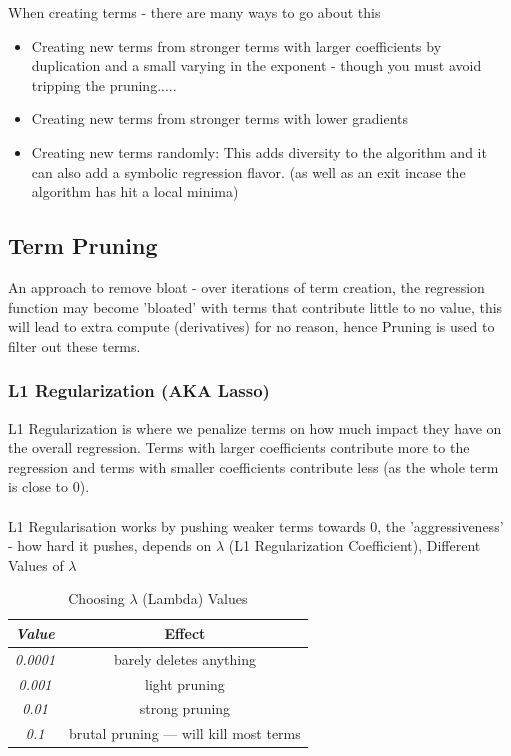 \documentclass[11pt]{article}
\begin{document}
When creating terms - there are many ways to go about this
\begin{itemize}
    \item Creating new terms from stronger terms with larger coefficients by duplication and a small varying in the exponent - though you must avoid tripping the pruning.....
    \item Creating new terms from stronger terms with lower gradients
    \item Creating new terms randomly: This adds diversity to the algorithm and it can also add a symbolic regression flavor. (as well as an exit incase the algorithm has hit a local minima)
\end{itemize}



\subsection{Term Pruning}
An approach to remove bloat - over iterations of term creation, the regression function may become 'bloated' with terms that contribute little to no value, this will lead to extra compute (derivatives) for no reason, hence Pruning is used to filter out these terms.
\subsubsection{L1 Regularization (AKA Lasso)}
L1 Regularization is where we penalize terms on how much impact they have on the overall regression. Terms with larger coefficients contribute more to the regression and terms with smaller coefficients contribute less (as the whole term is close to 0). \\\\L1 Regularisation works by pushing weaker terms towards 0, the 'aggressiveness' - how hard it pushes, depends on \(\lambda\) (L1 Regularization Coefficient), Different Values of \(\lambda\)
\begin{table}[h!]
\centering
\begin{tabular}{|c|c|}
\hline
\textit{Value} & Effect \\ \hline
\textit{0.0001} & barely deletes anything \\
\textit{0.001} & light pruning \\
\textit{0.01} & strong pruning \\
\textit{0.1} & brutal pruning — will kill most terms \\ \hline
\end{tabular}
\caption{Choosing $\lambda$ (Lambda) Values}
\end{table}
\end{document}
